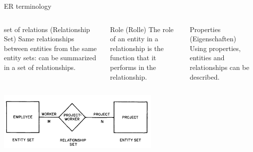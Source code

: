 \begin{frame}{ER terminology~\parencite[9--12]{chen1976}}
  \begin{columns}[T,onlytextwidth]
    \footnotesize
      \begin{exampleblock}{set of relations (Relationship Set)}
        Same relationships between entities from the same entity sets: can be summarized in a set of relationships.
      \end{exampleblock}



      \begin{block}{Role (Rolle)} \footnotesize
        The role of an entity in a relationship is the function that it performs in the relationship.
      \end{block}
      
      \begin{alertblock}{Properties (Eigenschaften)}\footnotesize
        Using properties, entities and relationships can be described. 
      \end{alertblock}
  \end{columns}
  \begin{center}
      \includegraphics[width=0.6\textwidth]{img/er-bsp.png}
  \end{center}
\end{frame}


